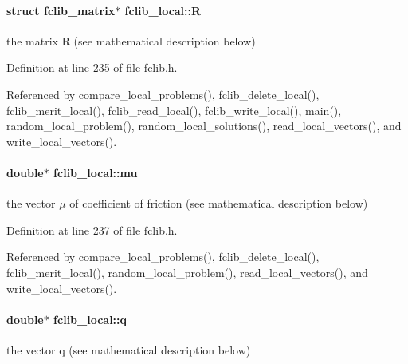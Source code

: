 \paragraph[{R}]{\setlength{\rightskip}{0pt plus 5cm}struct {\bf fclib\+\_\+matrix}$\ast$ fclib\+\_\+local\+::\+R}\label{structfclib__local_ae08751b33a0771d54d48aee48f838ced}


the matrix R (see mathematical description below) 



Definition at line 235 of file fclib.\+h.



Referenced by compare\+\_\+local\+\_\+problems(), fclib\+\_\+delete\+\_\+local(), fclib\+\_\+merit\+\_\+local(), fclib\+\_\+read\+\_\+local(), fclib\+\_\+write\+\_\+local(), main(), random\+\_\+local\+\_\+problem(), random\+\_\+local\+\_\+solutions(), read\+\_\+local\+\_\+vectors(), and write\+\_\+local\+\_\+vectors().

\hypertarget{structfclib__local_a90d9490cac0bc9b69fd13253882f1557}{}
\paragraph[{mu}]{\setlength{\rightskip}{0pt plus 5cm}double$\ast$ fclib\+\_\+local\+::mu}\label{structfclib__local_a90d9490cac0bc9b69fd13253882f1557}


the vector $\mu$ of coefficient of friction (see mathematical description below) 



Definition at line 237 of file fclib.\+h.



Referenced by compare\+\_\+local\+\_\+problems(), fclib\+\_\+delete\+\_\+local(), fclib\+\_\+merit\+\_\+local(), random\+\_\+local\+\_\+problem(), read\+\_\+local\+\_\+vectors(), and write\+\_\+local\+\_\+vectors().

\hypertarget{structfclib__local_a9a032092a828a13a7e106cce4ba7ad96}{}
\paragraph[{q}]{\setlength{\rightskip}{0pt plus 5cm}double$\ast$ fclib\+\_\+local\+::q}\label{structfclib__local_a9a032092a828a13a7e106cce4ba7ad96}


the vector q (see mathematical description below) 



